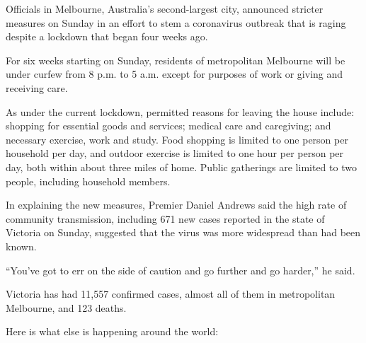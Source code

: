 Officials in Melbourne, Australia's second-largest city, announced
stricter measures on Sunday in an effort to stem a coronavirus outbreak
that is raging despite a lockdown that began four weeks ago.

For six weeks starting on Sunday, residents of metropolitan Melbourne
will be under curfew from 8 p.m. to 5 a.m. except for purposes of work
or giving and receiving care.

As under the current lockdown, permitted reasons for leaving the house
include: shopping for essential goods and services; medical care and
caregiving; and necessary exercise, work and study. Food shopping is
limited to one person per household per day, and outdoor exercise is
limited to one hour per person per day, both within about three miles of
home. Public gatherings are limited to two people, including household
members.

In explaining the new measures, Premier Daniel Andrews said the high
rate of community transmission, including 671 new cases reported in the
state of Victoria on Sunday, suggested that the virus was more
widespread than had been known.

``You've got to err on the side of caution and go further and go
harder,'' he said.

Victoria has had 11,557 confirmed cases, almost all of them in
metropolitan Melbourne, and 123 deaths.

Here is what else is happening around the world:

